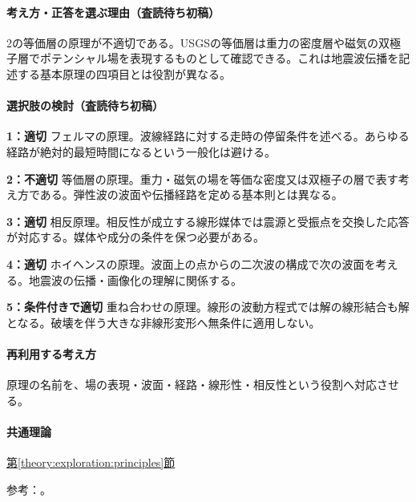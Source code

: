 \paragraph{考え方・正答を選ぶ理由（査読待ち初稿）} 2の等価層の原理が不適切である。USGSの等価層は重力の密度層や磁気の双極子層でポテンシャル場を表現するものとして確認できる。これは地震波伝播を記述する基本原理の四項目とは役割が異なる。

\paragraph{選択肢の検討（査読待ち初稿）}\mbox{}\par

\noindent\textbf{1：適切} フェルマの原理。波線経路に対する走時の停留条件を述べる。あらゆる経路が絶対的最短時間になるという一般化は避ける。\par

\noindent\textbf{2：不適切} 等価層の原理。重力・磁気の場を等価な密度又は双極子の層で表す考え方である。弾性波の波面や伝播経路を定める基本則とは異なる。\par

\noindent\textbf{3：適切} 相反原理。相反性が成立する線形媒体では震源と受振点を交換した応答が対応する。媒体や成分の条件を保つ必要がある。\par

\noindent\textbf{4：適切} ホイヘンスの原理。波面上の点からの二次波の構成で次の波面を考える。地震波の伝播・画像化の理解に関係する。\par

\noindent\textbf{5：条件付きで適切} 重ね合わせの原理。線形の波動方程式では解の線形結合も解となる。破壊を伴う大きな非線形変形へ無条件に適用しない。\par

\paragraph{再利用する考え方} 原理の名前を、場の表現・波面・経路・線形性・相反性という役割へ対応させる。

\paragraph{共通理論} \hyperref[theory:exploration:principles]{第\ref*{theory:exploration:principles}節}

\par 参考：\cite{usgs_equivalent2007,stanford_downward2001,mit_signals2010}。

